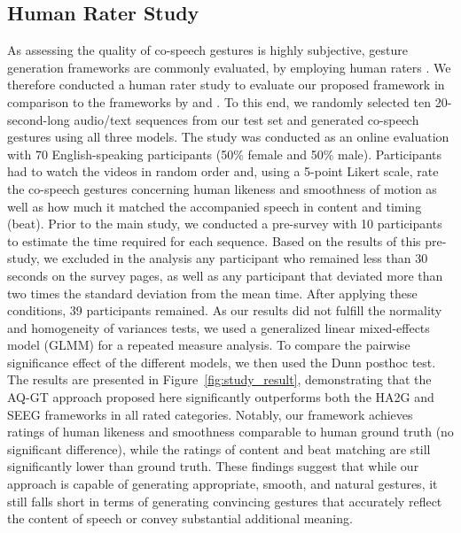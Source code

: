 \documentclass[sigconf]{acmart}
\begin{document}
\subsection{Human Rater Study}
As assessing the quality of co-speech gestures is highly subjective, gesture generation frameworks are commonly evaluated, by employing human raters  \cite{nyatsangaComprehensiveReviewDataDriven2023b}. We therefore conducted a human rater study to evaluate our proposed framework in comparison to the frameworks by \citet{liuLearningHierarchicalCrossModal2022a} and \citet{liangSEEGSemanticEnergized2022}. To this end, we randomly selected ten 20-second-long audio/text sequences from our test set and generated co-speech gestures using all three models. The study was conducted as an online evaluation with 70 English-speaking participants (50\% female and 50\% male). Participants had to watch the videos in random order and, using a 5-point Likert scale, rate the co-speech gestures concerning human likeness and smoothness of motion as well as how much it matched the accompanied speech in content and timing (beat). Prior to the main study, we conducted a pre-survey with 10 participants to estimate the time required for each sequence. Based on the results of this pre-study, we excluded in the analysis any participant who remained less than 30 seconds on the survey pages, as well as any participant that deviated more than two times the standard deviation from the mean time. After applying these conditions, 39 participants remained. As our results did not fulfill the normality and homogeneity of variances tests, we used a generalized linear mixed-effects model (GLMM) for a repeated measure analysis. To compare the pairwise significance effect of the different models, we then used the Dunn posthoc test. The results are presented in Figure~\ref{fig:study_result},  demonstrating that the AQ-GT approach proposed here significantly outperforms both the HA2G and SEEG frameworks in all rated categories. Notably, our framework achieves ratings of human likeness and smoothness comparable to human ground truth (no significant difference), while the ratings of content and beat matching are still significantly lower than ground truth. These findings suggest that while our approach is capable of generating appropriate, smooth, and natural gestures, it still falls short in terms of generating convincing gestures that accurately reflect the content of speech or convey substantial additional meaning.
\end{document}
